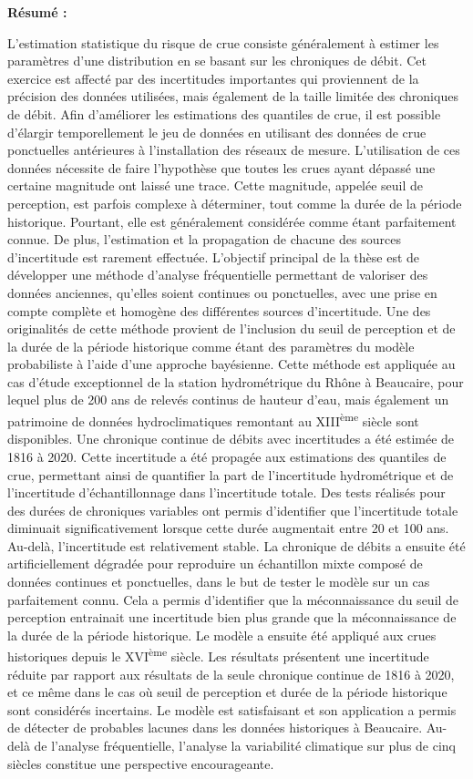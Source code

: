\vfill

\noindent \textbf{Résumé :}

\noindent \small{L'estimation statistique du risque de crue consiste généralement à estimer les paramètres d'une distribution en se basant sur les chroniques de débit. Cet exercice est affecté par des incertitudes importantes qui proviennent de la précision des données utilisées, mais également de la taille limitée des chroniques de débit. Afin d'améliorer les estimations des quantiles de crue, il est possible d'élargir temporellement le jeu de données en utilisant des données de crue ponctuelles antérieures à l'installation des réseaux de mesure. L'utilisation de ces données nécessite  de faire l'hypothèse que toutes les crues ayant dépassé une certaine magnitude ont laissé une trace. Cette magnitude, appelée seuil de perception, est parfois complexe à déterminer, tout comme la durée de la période historique. Pourtant, elle est généralement considérée comme étant parfaitement connue. De plus, l'estimation et la propagation de chacune des sources d'incertitude est rarement effectuée. L'objectif principal de la thèse est de développer une méthode d'analyse fréquentielle permettant de valoriser des données anciennes, qu'elles soient continues ou ponctuelles, avec une prise en compte complète et homogène des différentes sources d'incertitude. Une des originalités de cette méthode provient de l'inclusion du seuil de perception et de la durée de la période historique comme étant des paramètres du modèle probabiliste à l'aide d'une approche bayésienne. Cette méthode est appliquée au cas d'étude exceptionnel de la station hydrométrique du Rhône à Beaucaire, pour lequel plus de 200 ans de relevés continus de hauteur d'eau, mais également un patrimoine de données hydroclimatiques remontant au XIII\textsuperscript{ème} siècle sont disponibles. Une chronique continue de débits avec incertitudes a été estimée de 1816 à 2020. Cette incertitude a été propagée aux estimations des quantiles de crue, permettant ainsi de quantifier la part de l'incertitude hydrométrique et de l'incertitude d'échantillonnage dans l'incertitude totale. Des tests réalisés pour des durées de chroniques variables ont permis d'identifier que l'incertitude totale diminuait significativement lorsque cette durée augmentait entre 20 et 100 ans. Au-delà, l'incertitude est relativement stable. La chronique de débits a ensuite été artificiellement dégradée pour reproduire un échantillon mixte composé de données continues et ponctuelles, dans le but de tester le modèle sur un cas parfaitement connu. Cela a permis d'identifier que la méconnaissance du seuil de perception entrainait une incertitude bien plus grande que la méconnaissance de la durée de la période historique. Le modèle a ensuite été appliqué aux crues historiques depuis le XVI\textsuperscript{ème} siècle. Les résultats présentent une incertitude réduite par rapport aux résultats de la seule chronique continue de 1816 à 2020, et ce même dans le cas où seuil de perception et durée de la période historique sont considérés incertains. Le modèle est satisfaisant et son application a permis de détecter de probables lacunes dans les données historiques à Beaucaire. Au-delà de l'analyse fréquentielle, l'analyse la variabilité climatique sur plus de cinq siècles constitue une perspective encourageante.
}